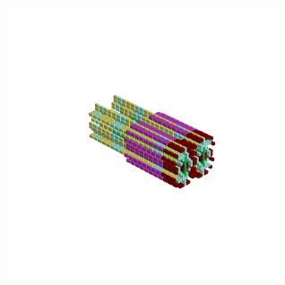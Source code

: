 \begin{minipage}[b]{0.50\linewidth}
\begin{figure}[H]
        \vspace*{-8cm}
        \hspace*{2cm}
        \includegraphics[width=8cm]{src/symmetries/pattern8_4-45.png}
        \vspace*{-2.5cm}
  \caption*{}
  \end{figure}
\end{minipage}
\hspace{1cm}
